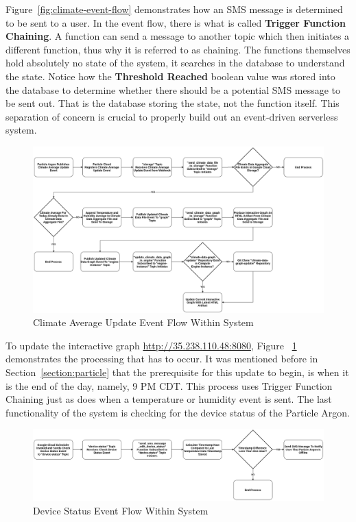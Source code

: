 \documentclass{article}
\begin{document}
Figure~\ref{fig:climate-event-flow} demonstrates how an SMS message is determined to be sent to a user. In the event flow, there is what is called \textbf{Trigger Function Chaining}. A function can send a message to another topic which then initiates a different function, thus why it is referred to as chaining. The functions themselves hold absolutely no state of the system, it searches in the database to understand the state. Notice how the \textbf{Threshold Reached} boolean value was stored into the database to determine whether there should be a potential SMS message to be sent out. That is the database storing the state, not the function itself. This separation of concern is crucial to properly build out an event-driven serverless system.

\begin{figure}[H]
	\center
	\includegraphics[width=\textwidth]{images/graph-event-flow.png}
	\caption{Climate Average Update Event Flow Within System}
	\label{fig:graph-event-flow}
\end{figure}

To update the interactive graph \url{http://35.238.110.48:8080}, Figure ~\ref{fig:graph-event-flow} demonstrates the processing that has to occur. It was mentioned before in Section~\ref{section:particle} that the prerequisite for this update to begin, is when it is the end of the day, namely, 9 PM CDT. This process uses Trigger Function Chaining just as does when a temperature or humidity event is sent. The last functionality of the system is checking for the device status of the Particle Argon.

\begin{figure}[H]
	\center
	\includegraphics[width=\textwidth]{images/device-status-event-flow.png}
	\caption{Device Status Event Flow Within System}
	\label{fig:device-status-event-flow}
\end{figure}
\end{document}

